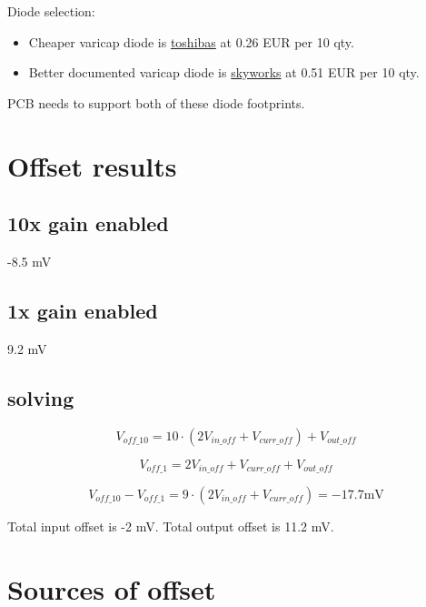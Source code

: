\documentclass[11pt]{article}
\begin{document}
Diode selection:
\begin{itemize}
  \item Cheaper varicap diode is \href{https://eu.mouser.com/ProductDetail/Toshiba/1SV324TPH3F?qs=EEns8I54Y6DPMP6VMy8m2w%3D%3D}{toshibas}
  at 0.26 EUR per 10 qty. 

  \item Better documented varicap diode is \href{https://eu.mouser.com/ProductDetail/Skyworks-Solutions-Inc/SMV1255-079LF?qs=WMHGlxXAKT8jslp0hTOZuw%3D%3D}{skyworks} 
  at 0.51 EUR per 10 qty. 
\end{itemize}

PCB needs to support both of these diode footprints.


\section{Offset results}
\subsection{10x gain enabled}
-8.5 \si{\milli \volt}

\subsection{1x gain enabled}
9.2 \si{\milli \volt}

\subsection{solving}

\begin{equation}
  V_{off\_10} = 10 \cdot (2 V_{in\_off} + V_{curr\_off}) + V_{out\_off}
\end{equation}

\begin{equation}
  V_{off\_1} = 2 V_{in\_off} + V_{curr\_off} + V_{out\_off}
\end{equation}

\begin{equation}
  V_{off\_10} - V_{off\_1}  = 9 \cdot (2 V_{in\_off} + V_{curr\_off}) = -17.7 \si{\milli \volt}
\end{equation}

Total input offset is -2 \si{\milli \volt}.
Total output offset is 11.2 \si{\milli \volt}.


\section{Sources of offset}
\end{document}
